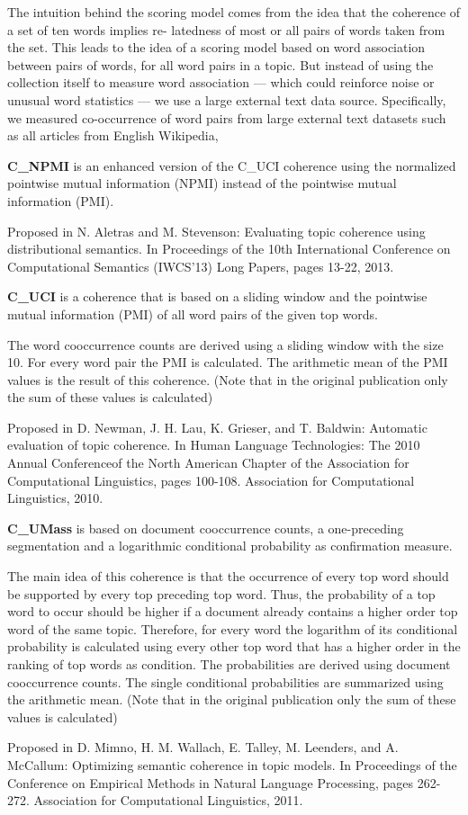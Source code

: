 \begin{enumerate}
 
 The intuition behind the scoring model comes from the
 idea that the coherence of a set of ten words implies re-
 latedness of most or all pairs of words taken from the set.
 This leads to the idea of a scoring model based on word
 association between pairs of words, for all word pairs in a
 topic. But instead of using the collection itself to measure
 word association — which could reinforce noise or unusual
 word statistics — we use a large external text data source.
 Specifically, we measured co-occurrence of word pairs from
 large external text datasets such as all articles from English
 Wikipedia,


\textbf{C\_NPMI} is an enhanced version of the C\_UCI coherence using the normalized pointwise mutual information (NPMI) instead of the pointwise mutual information (PMI).

Proposed in
N. Aletras and M. Stevenson: Evaluating topic coherence using distributional semantics. In Proceedings of the 10th International Conference on Computational Semantics (IWCS'13) Long Papers, pages 13-22, 2013.


\textbf{C\_UCI} is a coherence that is based on a sliding window and the pointwise mutual information (PMI) of all word pairs of the given top words.

The word cooccurrence counts are derived using a sliding window with the size 10. For every word pair the PMI is calculated. The arithmetic mean of the PMI values is the result of this coherence. (Note that in the original publication only the sum of these values is calculated)

Proposed in
D. Newman, J. H. Lau, K. Grieser, and T. Baldwin: Automatic evaluation of topic coherence. In Human Language Technologies: The 2010 Annual Conferenceof the North American Chapter of the Association for Computational Linguistics, pages 100-108. Association for Computational Linguistics, 2010.


\textbf{C\_UMass} is based on document cooccurrence counts, a one-preceding segmentation and a logarithmic conditional probability as confirmation measure.

The main idea of this coherence is that the occurrence of every top word should be supported by every top preceding top word. Thus, the probability of a top word to occur should be higher if a document already contains a higher order top word of the same topic. Therefore, for every word the logarithm of its conditional probability is calculated using every other top word that has a higher order in the ranking of top words as condition. The probabilities are derived using document cooccurrence counts. The single conditional probabilities are summarized using the arithmetic mean. (Note that in the original publication only the sum of these values is calculated)

Proposed in
D. Mimno, H. M. Wallach, E. Talley, M. Leenders, and A. McCallum: Optimizing semantic coherence in topic models. In Proceedings of the Conference on Empirical Methods in Natural Language Processing, pages 262-272. Association for Computational Linguistics, 2011.
\end{enumerate}
